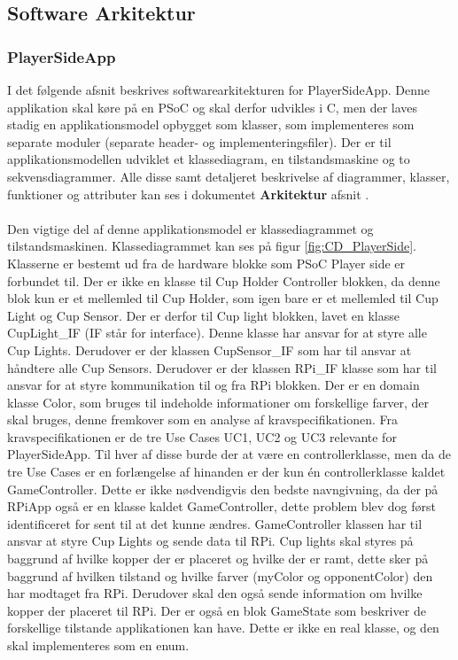 \documentclass[Rapport/Rapport_main.tex]{subfiles}
\begin{document}
\subsection{Software Arkitektur}

\subsubsection{PlayerSideApp}
I det følgende afsnit beskrives softwarearkitekturen for PlayerSideApp. Denne applikation skal køre på en PSoC og skal derfor udvikles i C, men der laves stadig en  applikationsmodel opbygget som klasser, som implementeres som separate moduler (separate header- og implementeringsfiler). Der er til applikationsmodellen udviklet et klassediagram, en tilstandsmaskine og to sekvensdiagrammer. Alle disse samt detaljeret beskrivelse af diagrammer, klasser, funktioner og attributer kan ses i dokumentet \textbf{Arkitektur} afsnit .\\\\
Den vigtige del af denne applikationsmodel er klassediagrammet og tilstandsmaskinen. Klassediagrammet kan ses på figur \ref{fig:CD_PlayerSide}. Klasserne er bestemt ud fra de hardware blokke som PSoC Player side er forbundet til. Der er ikke en klasse til Cup Holder Controller blokken, da denne blok kun er et mellemled til Cup Holder, som igen bare er et mellemled til Cup Light og Cup Sensor. Der er derfor til Cup light blokken, lavet en klasse CupLight\_IF (IF står for interface). Denne klasse har ansvar for at styre alle Cup Lights. Derudover er der klassen CupSensor\_IF som har til ansvar at håndtere alle Cup Sensors. Derudover er der klassen RPi\_IF klasse som har til ansvar for at styre kommunikation til og fra RPi blokken. Der er en domain klasse Color, som bruges til indeholde informationer om forskellige farver, der skal bruges, denne fremkover som en analyse af kravspecifikationen. Fra kravspecifikationen er de tre Use Cases UC1, UC2 og UC3 relevante for PlayerSideApp. Til hver af disse burde der at være en controllerklasse, men da de tre Use Cases er en forlængelse af hinanden er der kun én controllerklasse kaldet GameController. Dette er ikke nødvendigvis den bedste navngivning, da der på RPiApp også er en klasse kaldet GameController, dette problem blev dog først identificeret for sent til at det kunne ændres. GameController klassen har til ansvar at styre Cup Lights og sende data til RPi. Cup lights skal styres på baggrund af hvilke kopper der er placeret og hvilke der er ramt, dette sker på baggrund af hvilken tilstand og hvilke farver (myColor og opponentColor) den har modtaget fra RPi. Derudover skal den også sende information om hvilke kopper der placeret til RPi. Der er også en blok GameState som beskriver de forskellige tilstande applikationen kan have. Dette er ikke en real klasse, og den skal implementeres som en enum. 
\end{document}

